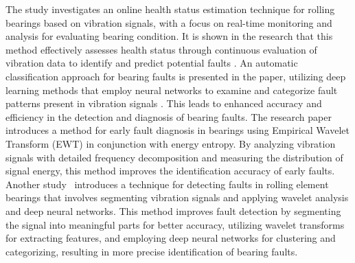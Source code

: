 \documentclass[sn-basic,pdflatex]{sn-jnl}
\theoremstyle{remark}
\theoremstyle{definition}
\begin{document}
The study investigates an online health status estimation technique for
rolling bearings based on vibration signals, with a focus on real-time
monitoring and analysis for evaluating bearing condition. It is shown in
the research that this method effectively assesses health status through
continuous evaluation of vibration data to identify and predict
potential faults \citep{WOS:000452922000015}. An automatic
classification approach for bearing faults is presented in the paper,
utilizing deep learning methods that employ neural networks to examine
and categorize fault patterns present in vibration signals
\citep{WOS:000453413600001}. This leads to enhanced accuracy and
efficiency in the detection and diagnosis of bearing faults. The
research paper \citep{WOS:000452819600235} introduces a method for early
fault diagnosis in bearings using Empirical Wavelet Transform (EWT) in
conjunction with energy entropy. By analyzing vibration signals with
detailed frequency decomposition and measuring the distribution of
signal energy, this method improves the identification accuracy of early
faults. Another study
\citep[\citet{WOS:000449334500118}]{WOS:000450745100001} ~introduces a
technique for detecting faults in rolling element bearings that involves
segmenting vibration signals and applying wavelet analysis and deep
neural networks. This method improves fault detection by segmenting the
signal into meaningful parts for better accuracy, utilizing wavelet
transforms for extracting features, and employing deep neural networks
for clustering and categorizing, resulting in more precise
identification of bearing faults.
\end{document}

